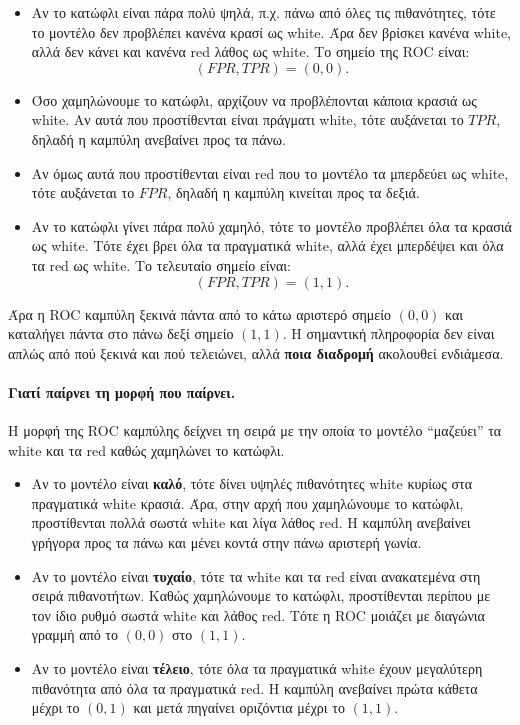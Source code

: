 \documentclass[11pt,a4paper]{article}
\begin{document}
\begin{itemize}
    \item Αν το κατώφλι είναι πάρα πολύ ψηλά, π.χ. πάνω από όλες τις
    πιθανότητες, τότε το μοντέλο δεν προβλέπει κανένα κρασί ως white.
    Άρα δεν βρίσκει κανένα white, αλλά δεν κάνει και κανένα red λάθος ως
    white. Το σημείο της ROC είναι:
    \[
    (FPR, TPR) = (0, 0).
    \]

    \item Όσο χαμηλώνουμε το κατώφλι, αρχίζουν να προβλέπονται κάποια κρασιά
    ως white. Αν αυτά που προστίθενται είναι πράγματι white, τότε αυξάνεται
    το \(TPR\), δηλαδή η καμπύλη ανεβαίνει προς τα πάνω.

    \item Αν όμως αυτά που προστίθενται είναι red που το μοντέλο τα μπερδεύει
    ως white, τότε αυξάνεται το \(FPR\), δηλαδή η καμπύλη κινείται προς τα
    δεξιά.

    \item Αν το κατώφλι γίνει πάρα πολύ χαμηλό, τότε το μοντέλο προβλέπει όλα
    τα κρασιά ως white. Τότε έχει βρει όλα τα πραγματικά white, αλλά έχει
    μπερδέψει και όλα τα red ως white. Το τελευταίο σημείο είναι:
    \[
    (FPR, TPR) = (1, 1).
    \]
\end{itemize}

Άρα η ROC καμπύλη ξεκινά πάντα από το κάτω αριστερό σημείο \((0,0)\) και
καταλήγει πάντα στο πάνω δεξί σημείο \((1,1)\). Η σημαντική πληροφορία δεν
είναι απλώς από πού ξεκινά και πού τελειώνει, αλλά \textbf{ποια διαδρομή}
ακολουθεί ενδιάμεσα.

\paragraph{Γιατί παίρνει τη μορφή που παίρνει.}
Η μορφή της ROC καμπύλης δείχνει τη σειρά με την οποία το μοντέλο ``μαζεύει''
τα white και τα red καθώς χαμηλώνει το κατώφλι.

\begin{itemize}
    \item Αν το μοντέλο είναι \textbf{καλό}, τότε δίνει υψηλές πιθανότητες
    white κυρίως στα πραγματικά white κρασιά. Άρα, στην αρχή που χαμηλώνουμε
    το κατώφλι, προστίθενται πολλά σωστά white και λίγα λάθος red. Η καμπύλη
    ανεβαίνει γρήγορα προς τα πάνω και μένει κοντά στην πάνω αριστερή γωνία.

    \item Αν το μοντέλο είναι \textbf{τυχαίο}, τότε τα white και τα red είναι
    ανακατεμένα στη σειρά πιθανοτήτων. Καθώς χαμηλώνουμε το κατώφλι,
    προστίθενται περίπου με τον ίδιο ρυθμό σωστά white και λάθος red. Τότε η
    ROC μοιάζει με διαγώνια γραμμή από το \((0,0)\) στο \((1,1)\).

    \item Αν το μοντέλο είναι \textbf{τέλειο}, τότε όλα τα πραγματικά white
    έχουν μεγαλύτερη πιθανότητα από όλα τα πραγματικά red. Η καμπύλη ανεβαίνει
    πρώτα κάθετα μέχρι το \((0,1)\) και μετά πηγαίνει οριζόντια μέχρι το
    \((1,1)\).
\end{itemize}
\end{document}
